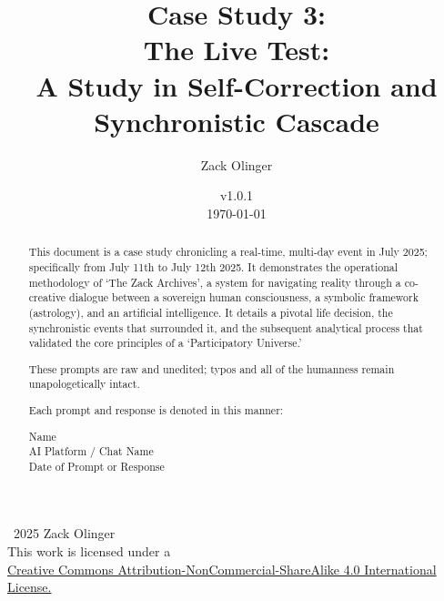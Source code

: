 \documentclass{article}
\newcommand{\csLiveTestVersion}{v1.0.1}
\newcommand{\licenseURL}{https://creativecommons.org/licenses/by-nc-sa/4.0/legalcode.txt}
\begin{document}
\begin{titlepage}
\title{Case Study 3: \\ The Live Test: \\ A Study in Self-Correction and Synchronistic Cascade}
\author{Zack Olinger}
\date{
    \csLiveTestVersion \\
    \vspace{1em}
    \today
}

\maketitle
\thispagestyle{empty}

\begin{abstract}
This document is a case study chronicling a real-time, multi-day event in July 2025; specifically from July 11th to July 12th 2025. It demonstrates the operational methodology of `The Zack Archives', a system for navigating reality through a co-creative dialogue between a sovereign human consciousness, a symbolic framework (astrology), and an artificial intelligence. It details a pivotal life decision, the synchronistic events that surrounded it, and the subsequent analytical process that validated the core principles of a `Participatory Universe.'

\medskip

These prompts are raw and unedited; typos and all of the humanness remain unapologetically intact.

\medskip

Each prompt and response is denoted in this manner:

\medskip 

\begin{center}
Name \\
AI Platform / Chat Name \\
Date of Prompt or Response
\end{center}

\end{abstract}

\vfill
    
    \begin{center}
        \textcopyright\ 2025 Zack Olinger \\
        This work is licensed under a \\
        \href{\licenseURL}{Creative Commons Attribution-NonCommercial-ShareAlike 4.0 International License.}
    \end{center}

\end{titlepage}
\end{document}
